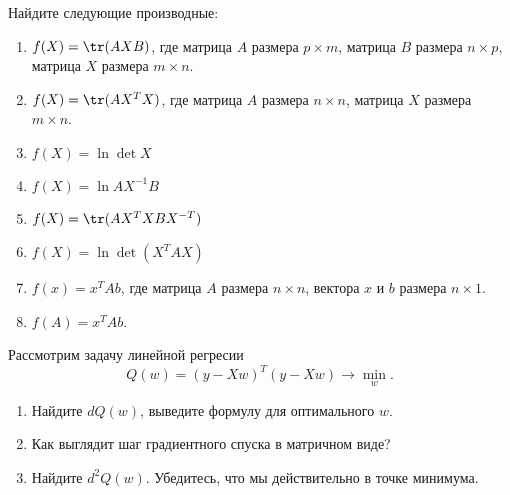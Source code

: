 \begin{problem}{}
	Найдите следующие производные:
	\begin{enumerate}
		\item $f(X) = \tr(AXB)$, где матрица $A$ размера $p \times m$, матрица $B$ размера $n \times p$, матрица $X$ размера $m \times n$. 
		
		\item $f(X) = \tr(AX^TX)$, где матрица $A$ размера $n \times n$, матрица $X$ размера $m \times n$. 
		
		\item $f(X) = \ln \det X$
		
		\item $f(X) = \ln AX^{-1}B$  %
		
		\item $f(X) = \tr(AX^TXBX^{-T})$
		
		\item $f(X) = \ln \det(X^TAX)$
		
		\item $f(x) = x^TAb$, где матрица $A$ размера $n \times n$, вектора $x$ и $b$ размера $n \times 1$. 
		
		\item $f(A) = x^TAb$. 
	\end{enumerate}
\end{problem}

\begin{problem}{}
	Рассмотрим задачу линейной регресии
	\[
	Q(w) = (y - Xw)^T(y - Xw) \to \min_{w}.
	\]
	
	\begin{enumerate}
		\item Найдите $dQ(w)$, выведите формулу для оптимального $w$.
		\item Как выглядит шаг градиентного спуска в матричном виде?
		\item Найдите $d^2Q(w)$. Убедитесь, что мы действительно в точке минимума. 
	\end{enumerate}
\end{problem}

